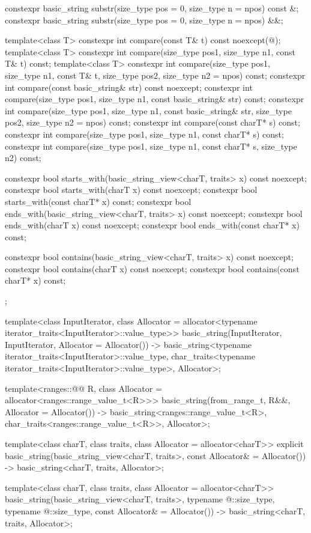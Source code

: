 \begin{codeblock}
{{    constexpr basic_string substr(size_type pos = 0, size_type n = npos) const &;
    constexpr basic_string substr(size_type pos = 0, size_type n = npos) &&;

    template<class T>
      constexpr int compare(const T& t) const noexcept(@\seebelow@);
    template<class T>
      constexpr int compare(size_type pos1, size_type n1, const T& t) const;
    template<class T>
      constexpr int compare(size_type pos1, size_type n1, const T& t,
                            size_type pos2, size_type n2 = npos) const;
    constexpr int compare(const basic_string& str) const noexcept;
    constexpr int compare(size_type pos1, size_type n1, const basic_string& str) const;
    constexpr int compare(size_type pos1, size_type n1, const basic_string& str,
                          size_type pos2, size_type n2 = npos) const;
    constexpr int compare(const charT* s) const;
    constexpr int compare(size_type pos1, size_type n1, const charT* s) const;
    constexpr int compare(size_type pos1, size_type n1, const charT* s, size_type n2) const;

    constexpr bool starts_with(basic_string_view<charT, traits> x) const noexcept;
    constexpr bool starts_with(charT x) const noexcept;
    constexpr bool starts_with(const charT* x) const;
    constexpr bool ends_with(basic_string_view<charT, traits> x) const noexcept;
    constexpr bool ends_with(charT x) const noexcept;
    constexpr bool ends_with(const charT* x) const;

    constexpr bool contains(basic_string_view<charT, traits> x) const noexcept;
    constexpr bool contains(charT x) const noexcept;
    constexpr bool contains(const charT* x) const;
  };

  template<class InputIterator,
           class Allocator = allocator<typename iterator_traits<InputIterator>::value_type>>
    basic_string(InputIterator, InputIterator, Allocator = Allocator())
      -> basic_string<typename iterator_traits<InputIterator>::value_type,
                      char_traits<typename iterator_traits<InputIterator>::value_type>,
                      Allocator>;

  template<ranges::@@ R,
           class Allocator = allocator<ranges::range_value_t<R>>>
    basic_string(from_range_t, R&&, Allocator = Allocator())
      -> basic_string<ranges::range_value_t<R>, char_traits<ranges::range_value_t<R>>,
                      Allocator>;

  template<class charT,
           class traits,
           class Allocator = allocator<charT>>
    explicit basic_string(basic_string_view<charT, traits>, const Allocator& = Allocator())
      -> basic_string<charT, traits, Allocator>;

  template<class charT,
           class traits,
           class Allocator = allocator<charT>>
    basic_string(basic_string_view<charT, traits>,
                 typename @\seebelow@::size_type, typename @\seebelow@::size_type,
                 const Allocator& = Allocator())
      -> basic_string<charT, traits, Allocator>;
}
\end{codeblock}

